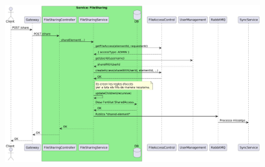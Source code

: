 \begin{figure}[H]
    \centering
    \includegraphics[width=\textwidth]{Figures/flux/share_files.png}
\end{figure}

